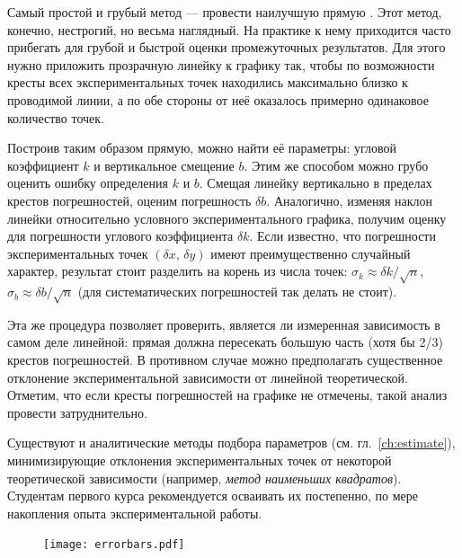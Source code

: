 Самый простой и грубый метод --- провести наилучшую прямую
. Этот метод, конечно, нестрогий,
но весьма наглядный. На практике к нему приходится часто прибегать
для грубой и быстрой оценки промежуточных результатов. Для этого нужно
приложить прозрачную линейку к графику так, чтобы по возможности кресты
всех экспериментальных точек находились максимально близко к проводимой
линии, а по обе стороны от неё оказалось примерно одинаковое количество
точек.


Построив таким образом  прямую,
можно найти её параметры: угловой коэффициент $k$ и вертикальное
смещение $b$. Этим же способом можно грубо оценить ошибку определения
$k$ и $b$. Смещая линейку вертикально в пределах крестов погрешностей,
оценим погрешность $\delta b$. Аналогично, изменяя наклон линейки
относительно условного 
экспериментального графика, получим оценку для погрешности углового
коэффициента $\delta k$. Если известно, что погрешности экспериментальных
точек $\left(\delta x,\,\delta y\right)$ имеют преимущественно случайный
характер, результат стоит разделить на корень из числа точек:
$\sigma_{k}\approx\delta k/\sqrt{n}$,
$\sigma_{b}\approx\delta b/\sqrt{n}$ (для систематических погрешностей
так делать не стоит).

Эта же процедура позволяет проверить, является ли измеренная зависимость
в самом деле линейной: прямая должна пересекать большую часть (хотя
бы 2/3) крестов погрешностей. В противном случае можно предполагать
существенное отклонение экспериментальной зависимости от линейной
теоретической. Отметим, что если кресты погрешностей на графике не
отмечены, такой анализ провести затруднительно.

Существуют и аналитические методы подбора параметров (см. гл.~\ref{ch:estimate}),
минимизирующие отклонения экспериментальных точек от некоторой теоретической зависимости
(например, \emph{метод наименьших квадратов}). Студентам первого курса
рекомендуется осваивать их постепенно, по мере накопления опыта экспериментальной
работы.

\begin{figure}
    \centering
    \texttt{[image: errorbars.pdf]}
    \caption{}
    \label{fig:graph-method}
\end{figure}


